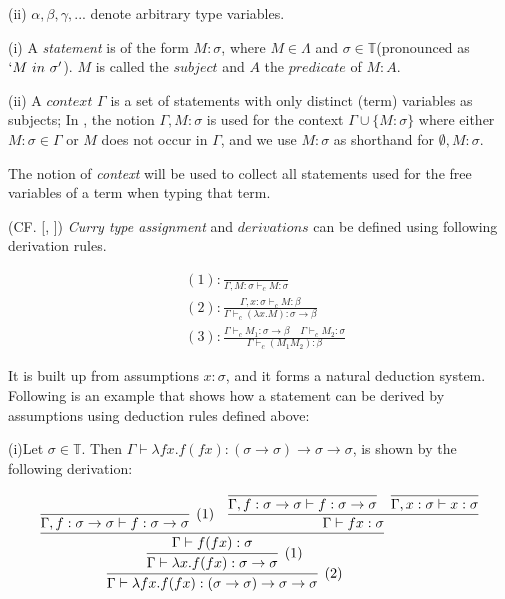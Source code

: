 (ii) $\alpha,\beta,\gamma,...$ denote arbitrary type variables.



\begin{def1}
\normalfont (i) A \textit{statement} is of the form $M : \sigma$, where $M\in \Lambda$ and $\sigma \in \mathbb{T}$(pronounced as $`M\ in\ \sigma'$). $M$ is called the $subject$ and $A$ the $predicate$ of $M : A$.  
\end{def1}
(ii) A $context$ $\Gamma$ is a set of statements with only distinct (term) variables as subjects; In \cite{svb2001type}, the notion $\Gamma,M:\sigma$ is used for the context $\Gamma \cup \{M:\sigma\}$ where either $M:\sigma \in \Gamma$ or $M$ does not occur in $\Gamma$, and we use $M:\sigma$ as shorthand for $\emptyset,M:\sigma$.

The notion of \textit{context} will be used to collect all statements used for the free variables of a term when typing that term\cite{svb2001type}. 


\begin{def1}
\normalfont (CF. [\cite{curry1934functionality}, \cite{curry1972combinatory}]) \textit{Curry type assignment} and $derivations$ can be defined using following derivation rules.  
\end{def1}
\begin{align*}
&(1):\frac{}{\Gamma ,M:\sigma \vdash _cM:\sigma} \\
&(2):\frac{\Gamma ,x:\sigma \vdash _cM:\beta}{\Gamma \vdash _c(\lambda x.M):\sigma \rightarrow \beta} \\
&(3):\frac{\Gamma \vdash _cM_1:\sigma \rightarrow \beta\ \ \ \ \ \Gamma \vdash _cM_2:\sigma}{\Gamma \vdash _c(M_1M_2):\beta} 
\end{align*}

It is built up from assumptions $x:\sigma$, and it forms a natural deduction system. Following is an example that shows how a statement can be derived by assumptions using deduction rules defined above:

\begin{exmp}\label{exp}
\normalfont (i)Let $\sigma \in \mathbb{T}$. Then $\Gamma \vdash \lambda fx.f(fx):(\sigma \rightarrow \sigma)\rightarrow \sigma \rightarrow \sigma$, is shown by the following derivation:
\end{exmp}

$$
\infer[(2)]{\Gamma \vdash \lambda fx.f(fx):(\sigma \rightarrow \sigma)\rightarrow \sigma \rightarrow \sigma}{
	\infer[(1)]{\Gamma \vdash \lambda x.f(fx):\sigma \rightarrow \sigma}{
      \infer{\Gamma \vdash f(fx):\sigma}{
             \infer[(1)]{\Gamma,f:\sigma \rightarrow \sigma \vdash f:\sigma \rightarrow \sigma}{}
             & 
             \infer{\Gamma \vdash fx:\sigma}{
                \infer{\Gamma,f:\sigma \rightarrow \sigma \vdash f:\sigma \rightarrow \sigma}{}
                &
                \infer{\Gamma,x:\sigma \vdash x:\sigma}{}
             }
         }
      }		
	}
$$


